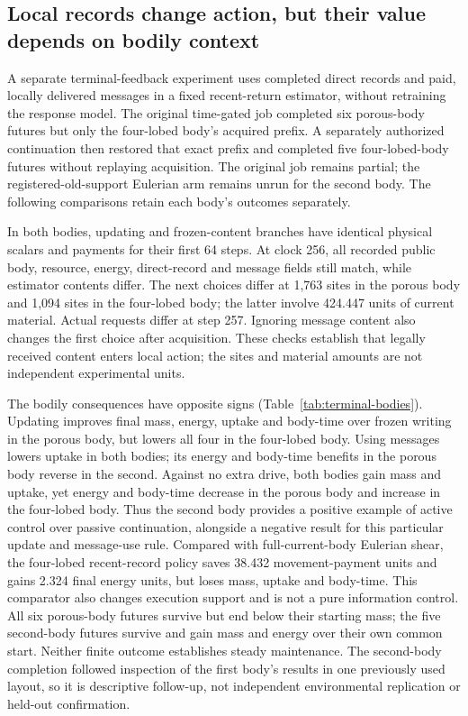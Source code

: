 \subsection*{Local records change action, but their value depends on bodily context}
A separate terminal-feedback experiment uses completed direct records and paid, locally delivered messages in a fixed recent-return estimator, without retraining the response model. The original time-gated job completed six porous-body futures but only the four-lobed body's acquired prefix. A separately authorized continuation then restored that exact prefix and completed five four-lobed-body futures without replaying acquisition. The original job remains partial; the registered-old-support Eulerian arm remains unrun for the second body. The following comparisons retain each body's outcomes separately.

In both bodies, updating and frozen-content branches have identical physical scalars and payments for their first 64 steps. At clock 256, all recorded public body, resource, energy, direct-record and message fields still match, while estimator contents differ. The next choices differ at 1,763 sites in the porous body and 1,094 sites in the four-lobed body; the latter involve 424.447 units of current material. Actual requests differ at step 257. Ignoring message content also changes the first choice after acquisition. These checks establish that legally received content enters local action; the sites and material amounts are not independent experimental units.

The bodily consequences have opposite signs (Table~\ref{tab:terminal-bodies}). Updating improves final mass, energy, uptake and body-time over frozen writing in the porous body, but lowers all four in the four-lobed body. Using messages lowers uptake in both bodies; its energy and body-time benefits in the porous body reverse in the second. Against no extra drive, both bodies gain mass and uptake, yet energy and body-time decrease in the porous body and increase in the four-lobed body. Thus the second body provides a positive example of active control over passive continuation, alongside a negative result for this particular update and message-use rule. Compared with full-current-body Eulerian shear, the four-lobed recent-record policy saves 38.432 movement-payment units and gains 2.324 final energy units, but loses mass, uptake and body-time. This comparator also changes execution support and is not a pure information control. All six porous-body futures survive but end below their starting mass; the five second-body futures survive and gain mass and energy over their own common start. Neither finite outcome establishes steady maintenance. The second-body completion followed inspection of the first body's results in one previously used layout, so it is descriptive follow-up, not independent environmental replication or held-out confirmation.

